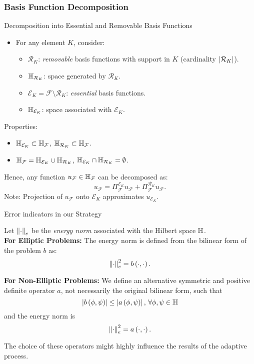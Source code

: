 \begin{frame}
\frametitle{Basis Function Decomposition}
\begin{block}{Decomposition into Essential and Removable Basis Functions}
    \begin{itemize}
        \item For any element $K$, consider:
        \begin{itemize}
            \item $\mathcal{R}_K$: \emph{removable} basis functions with support in $K$ (cardinality $\left|\mathcal{R}_K\right|$).
            \item $\mathbb{H}_{\mathcal{R}_K}$: space generated by $\mathcal{R}_K$.
            \item $\mathcal{E}_K = \mathcal{F} \setminus \mathcal{R}_K$: \emph{essential} basis functions.
            \item $\mathbb{H}_{\mathcal{E}_K}$: space associated with $\mathcal{E}_K$.
        \end{itemize}
    \end{itemize}
    Properties:
    \begin{itemize}
        \item $\mathbb{H}_{\mathcal{E}_K} \subset \mathbb{H}_{\mathcal{F}}$, $\mathbb{H}_{\mathcal{R}_K} \subset \mathbb{H}_{\mathcal{F}}$.
        \item $\mathbb{H}_{\mathcal{F}} = \mathbb{H}_{\mathcal{E}_K} \cup \mathbb{H}_{\mathcal{R}_K}$, $\mathbb{H}_{\mathcal{E}_K}\cap \mathbb{H}_{\mathcal{R}_K} = \emptyset$.
    \end{itemize}
\end{block}
Hence, any function $u_{\mathcal{F}} \in \mathbb{H}_{\mathcal{F}}$ can be decomposed as:
\begin{equation}
    u_{\mathcal{F}} =  \Pi_{\mathcal{F}}^{\mathcal{E}_K} u_{\mathcal{F}} + \Pi_{\mathcal{F}}^{\mathcal{R}_K} u_{\mathcal{F}}.
\end{equation}
Note: Projection of $u_{\mathcal{F}}$ onto $\mathcal{E}_K$ approximates $u_{\mathcal{E}_K}$.
\end{frame}

\begin{frame}{Error indicators in our Strategy}

Let $\left\|\cdot\right\|_e$ be the \emph{energy norm} associated with the Hilbert space $\mathbb{H}$. \\

\textbf{For Elliptic Problems:}
The energy norm is defined from the bilinear form of the problem $b$ as:
\[\left\|\cdot\right\|_e^2 = b\left(\cdot, \cdot\right).\]

\textbf{For Non-Elliptic Problems:}
We define an alternative symmetric and positive definite operator $a$, not necessarily the original bilinear form, such that 
\[\left|b\left(\phi, \psi\right)\right| \leq \left|a\left(\phi, \psi\right)\right|, \, \forall \phi, \psi \in \mathbb{H}\]
and the energy norm is 
\[\left\|\cdot\right\|_e^2 = a\left(\cdot, \cdot\right).\]

The choice of these operators might highly influence the results of the adaptive process.

\end{frame}

